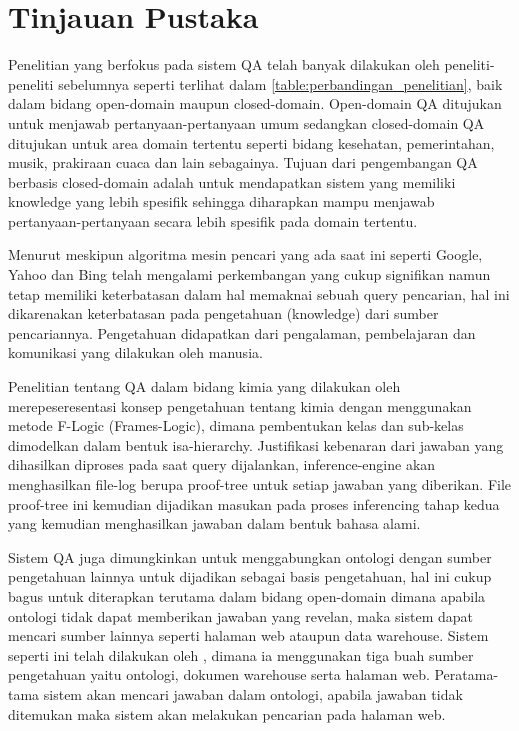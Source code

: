 \section{Tinjauan Pustaka}
Penelitian yang berfokus pada sistem QA telah banyak dilakukan oleh peneliti-peneliti sebelumnya seperti terlihat dalam \ref{table:perbandingan_penelitian}, baik dalam bidang open-domain maupun closed-domain. Open-domain QA ditujukan untuk menjawab pertanyaan-pertanyaan umum sedangkan closed-domain QA ditujukan untuk area domain tertentu seperti bidang kesehatan, pemerintahan, musik, prakiraan cuaca dan lain sebagainya. Tujuan dari pengembangan QA berbasis closed-domain adalah untuk mendapatkan sistem yang memiliki knowledge yang lebih spesifik sehingga diharapkan mampu menjawab pertanyaan-pertanyaan secara lebih spesifik pada domain tertentu.

Menurut \citet{zadeh} meskipun algoritma mesin pencari yang ada saat ini seperti Google, Yahoo dan Bing telah mengalami perkembangan yang cukup signifikan namun tetap memiliki keterbatasan dalam hal memaknai sebuah query pencarian, hal ini dikarenakan keterbatasan pada pengetahuan (knowledge) dari sumber pencariannya. Pengetahuan didapatkan dari pengalaman, pembelajaran dan komunikasi yang dilakukan oleh manusia.

Penelitian tentang QA dalam bidang kimia yang dilakukan oleh merepeseresentasi konsep pengetahuan tentang kimia dengan menggunakan metode F-Logic (Frames-Logic), dimana pembentukan kelas dan sub-kelas dimodelkan dalam bentuk isa-hierarchy. Justifikasi kebenaran dari jawaban yang dihasilkan diproses pada saat query dijalankan, inference-engine akan menghasilkan file-log berupa proof-tree untuk setiap jawaban yang diberikan. File proof-tree ini kemudian dijadikan masukan pada proses inferencing tahap kedua yang kemudian menghasilkan jawaban dalam bentuk bahasa alami.

Sistem QA juga dimungkinkan untuk menggabungkan ontologi dengan sumber pengetahuan lainnya untuk dijadikan sebagai basis pengetahuan, hal ini cukup bagus untuk diterapkan terutama dalam bidang open-domain dimana apabila ontologi tidak dapat memberikan jawaban yang revelan, maka sistem dapat mencari sumber lainnya seperti halaman web ataupun data warehouse. Sistem seperti ini telah dilakukan oleh \citet*{guo_zhang}, dimana ia menggunakan tiga buah sumber pengetahuan yaitu ontologi, dokumen warehouse serta halaman web. Peratama-tama sistem akan mencari jawaban dalam ontologi, apabila jawaban tidak ditemukan maka sistem akan melakukan pencarian pada halaman web.

